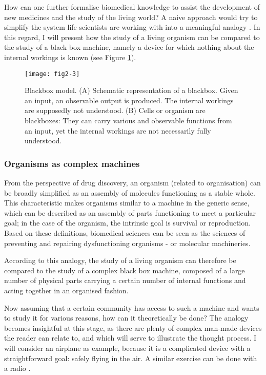 How can one further formalise biomedical knowledge to assist the development of new medicines and the study of the living world? A naive approach would try to simplify the system life scientists are working with into a meaningful analogy \citep{lazebnik2002can}. In this regard, I will present how the study of a living organism can be compared to the study of a black box machine, namely a device for which nothing about the internal workings is known (see Figure \ref{fig2-3}).

\begin{figure}[ht]
    \centering
    \texttt{[image: fig2-3]}
    \caption{Blackbox model. (A) Schematic representation of a blackbox. Given an input, an observable output is produced. The internal workings are supposedly not understood. (B) Cells or organism are blackboxes: They can carry various and observable functions from an input, yet the internal workings are not necessarily fully understood.}
    \label{fig2-3}
\end{figure}

\subsubsection{Organisms as complex machines}

From the perspective of drug discovery, an organism (related to organisation) can be broadly simplified as an assembly of molecules functioning as a stable whole. This characteristic makes organisms similar to a machine in the generic sense, which can be described as an assembly of parts functioning to meet a particular goal; in the case of the organism, the intrinsic goal is survival or reproduction. Based on these definitions, biomedical sciences can be seen as the sciences of preventing and repairing dysfunctioning organisms - or molecular machineries.

According to this analogy, the study of a living organism can therefore be compared to the study of a complex black box machine, composed of a large number of physical parts carrying a certain number of internal functions and acting together in an organised fashion.

Now assuming that a certain community has access to such a machine and wants to study it for various reasons, how can it theoretically be done? The analogy becomes insightful at this stage, as there are plenty of complex man-made devices the reader can relate to, and which will serve to illustrate the thought process. I will consider an airplane as example, because it is a complicated device with a straightforward goal: safely flying in the air. A similar exercise can be done with a radio \citep{lazebnik2002can}.

